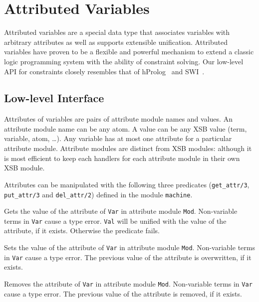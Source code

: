 \section{Attributed Variables} \label{sec:attributed-variables}

%
Attributed variables are a special data type that associates variables
with arbitrary attributes as well as supports extensible unification.
Attributed variables have proven to be a flexible and powerful
mechanism to extend a classic logic programming system with the
ability of constraint solving.  Our low-level API for constraints
closely resembles that of hProlog~\cite{hprolog} and
SWI~\cite{SWI-manual}.

\subsection{Low-level Interface}
%
Attributes of variables are pairs of attribute module names and
values.  An attribute module name can be any atom.  A value can be any
XSB value (term, variable, atom, \ldots). Any variable has at most one
attribute for a particular attribute module.  Attribute modules are
distinct from XSB modules: although it is most efficient to keep each
handlers for each attribute module in their own XSB module.

Attributes can be manipulated with the following three predicates
(\texttt{get\_attr/3}, \texttt{put\_attr/3} and \texttt{del\_attr/2})
defined in the module \texttt{machine}.

\begin{description}
%
Gets the value of the attribute of \texttt{Var} in attribute module
\texttt{Mod}. Non-variable terms in \texttt{Var} cause a type
error. \texttt{Val} will be unified with the value of the attribute,
if it exists. Otherwise the predicate fails.

%
Sets the value of the attribute of \texttt{Var} in attribute module
\texttt{Mod}. Non-variable terms in \texttt{Var} cause a type
error. The previous value of the attribute is overwritten, if it
exists.

%
Removes the attribute of \texttt{Var} in attribute module
\texttt{Mod}. Non-variable terms in \texttt{Var} cause a type
error. The previous value of the attribute is removed, if it exists.
\end{description}

